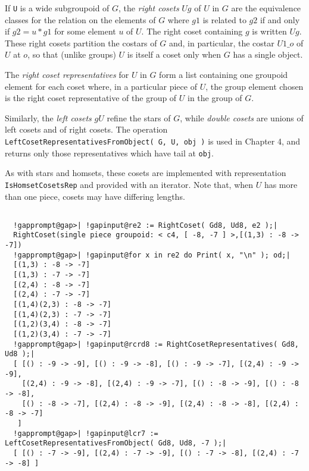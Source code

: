 \documentclass[a4paper,11pt]{report}
\begin{document}
{{{ If \texttt{U} is a wide subgroupoid of $G$, the \emph{right cosets} $Ug$ of $U$ in $G$ are the equivalence classes for the relation on the elements of $G$ where $g1$ is related to $g2$ if and only if $g2 = u*g1$ for some element $u$ of $U$. The right coset containing $g$ is written $Ug$. These right cosets partition the costars of $G$ and, in particular, the costar $U1\_{o}$ of $U$ at $o$, so that (unlike groups) $U$ is itself a coset only when $G$ has a single object. 

 The \emph{right coset representatives} for $U$ in $G$ form a list containing one groupoid element for each coset where, in a
particular piece of $U$, the group element chosen is the right coset representative of the group of $U$ in the group of $G$. 

 Similarly, the \emph{left cosets} $gU$ refine the stars of $G$, while \emph{double cosets} are unions of left cosets and of right cosets. The operation \texttt{LeftCosetRepresentativesFromObject( G, U, obj )} is used in Chapter 4, and returns only those representatives which have tail
at \texttt{obj}. 

 As with stars and homsets, these cosets are implemented with representation \texttt{IsHomsetCosetsRep} and provided with an iterator. Note that, when $U$ has more than one piece, cosets may have differing lengths. 

 }

 
\begin{Verbatim}[commandchars=!@|,fontsize=\small,frame=single,label=Example]
  
  !gapprompt@gap>| !gapinput@re2 := RightCoset( Gd8, Ud8, e2 );|
  RightCoset(single piece groupoid: < c4, [ -8, -7 ] >,[(1,3) : -8 -> -7])
  !gapprompt@gap>| !gapinput@for x in re2 do Print( x, "\n" ); od;|
  [(1,3) : -8 -> -7]
  [(1,3) : -7 -> -7]
  [(2,4) : -8 -> -7]
  [(2,4) : -7 -> -7]
  [(1,4)(2,3) : -8 -> -7]
  [(1,4)(2,3) : -7 -> -7]
  [(1,2)(3,4) : -8 -> -7]
  [(1,2)(3,4) : -7 -> -7]
  !gapprompt@gap>| !gapinput@rcrd8 := RightCosetRepresentatives( Gd8, Ud8 );|
  [ [() : -9 -> -9], [() : -9 -> -8], [() : -9 -> -7], [(2,4) : -9 -> -9],
    [(2,4) : -9 -> -8], [(2,4) : -9 -> -7], [() : -8 -> -9], [() : -8 -> -8],
    [() : -8 -> -7], [(2,4) : -8 -> -9], [(2,4) : -8 -> -8], [(2,4) : -8 -> -7]
   ]
  !gapprompt@gap>| !gapinput@lcr7 := LeftCosetRepresentativesFromObject( Gd8, Ud8, -7 );|
  [ [() : -7 -> -9], [(2,4) : -7 -> -9], [() : -7 -> -8], [(2,4) : -7 -> -8] ]
  
\end{Verbatim}
 }

}
\end{document}
